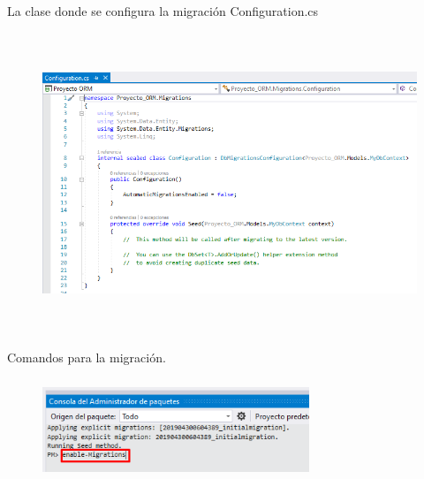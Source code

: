 \documentclass[12pt,a4paper,oneside]{book}
\begin{document}
\begin{enumerate}
\begin{enumerate}
\begin{enumerate}
							
							La clase donde se configura la migraci\'on Configuration.cs  \\
								\begin{figure}[htb]
									\centering \includegraphics[width=12cm, height=9cm]{img/Migraciones/11configuracion.png}
								\end{figure}
					\newpage
							Comandos para la migraci\'on.\\
								\begin{figure}[htb]
									\centering \includegraphics[width=8cm, height=3cm]{img/Migraciones/12comandos.png}
								\end{figure}
							

\end{enumerate}
\end{enumerate}
\end{enumerate}
\end{document}
